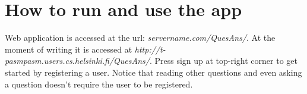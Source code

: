 \documentclass[a4paper,12pt]{article}
\begin{document}
\section{How to run and use the app}
Web application is accessed at the url: \emph{servername.com/QuesAns/}. At the moment of writing it is accessed at \emph{http://t-pasmpasm.users.cs.helsinki.fi/QuesAns/}. Press sign up at top-right corner to get started by registering a user. Notice that reading other questions and even asking a question doesn't require the user to be registered.
\end{document}
